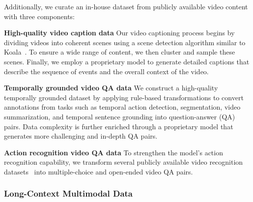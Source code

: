 \documentclass{article}
\begin{document}
Additionally, we curate an in-house dataset from publicly available video content with three components:

\textbf{High-quality video caption data} Our video captioning process begins by dividing videos into coherent scenes using a scene detection algorithm similar to Koala~\citep{wang2025koala}. To ensure a wide range of content, we then cluster and sample these scenes. Finally, we employ a proprietary model to generate detailed captions that describe the sequence of events and the overall context of the video.%

\textbf{Temporally grounded video QA data} We construct a high-quality temporally grounded dataset by applying rule-based transformations to convert annotations from tasks such as temporal action detection, segmentation, video summarization, and temporal sentence grounding into question-answer (QA) pairs. Data complexity is further enriched through a proprietary model that generates more challenging and in-depth QA pairs.

\textbf{Action recognition video QA data} To strengthen the model’s action recognition capability, we transform several publicly available video recognition datasets~\citep{carreira2019short,Goyal_2017_ICCV} into multiple-choice and open-ended video QA pairs.


\subsubsection{Long-Context Multimodal Data} \label{sec:pretrain_long_context_multimodal_data} %

\end{document}
